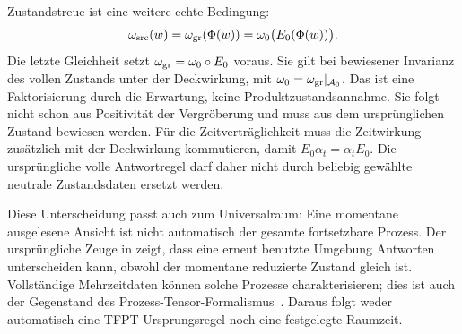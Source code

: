 Zustandstreue ist eine weitere echte Bedingung:
\[
 \omega_{\rm src}(w)=\omega_{\rm gr}(\Phi(w))
 =\omega_0\bigl(E_0(\Phi(w))\bigr).
\]
Die letzte Gleichheit setzt $\omega_{\rm gr}=\omega_0\circ E_0$ voraus. Sie gilt bei bewiesener Invarianz des vollen Zustands unter der Deckwirkung, mit $\omega_0=\omega_{\rm gr}|_{\mathcal A_0}$. Das ist eine Faktorisierung durch die Erwartung, keine Produktzustandsannahme. Sie folgt nicht schon aus Positivität der Vergröberung und muss aus dem ursprünglichen Zustand bewiesen werden. Für die Zeitverträglichkeit muss die Zeitwirkung zusätzlich mit der Deckwirkung kommutieren, damit $E_0\alpha_t=\alpha_tE_0$. Die ursprüngliche volle Antwortregel darf daher nicht durch beliebig gewählte neutrale Zustandsdaten ersetzt werden.

Diese Unterscheidung passt auch zum Universalraum: Eine momentane ausgelesene Ansicht ist nicht automatisch der gesamte fortsetzbare Prozess. Der ursprüngliche Zeuge in  zeigt, dass eine erneut benutzte Umgebung Antworten unterscheiden kann, obwohl der momentane reduzierte Zustand gleich ist. Vollständige Mehrzeitdaten können solche Prozesse charakterisieren; dies ist auch der Gegenstand des Prozess-Tensor-Formalismus~\cite{pollockprocess}. Daraus folgt weder automatisch eine TFPT-Ursprungsregel noch eine festgelegte Raumzeit.

